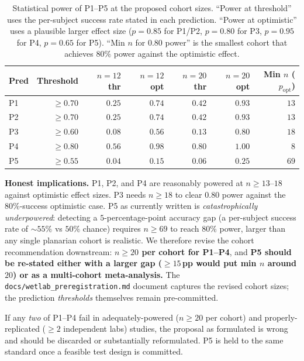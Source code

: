 \documentclass[11pt,a4paper]{article}
\begin{document}
\begin{table}[h]\centering\small
\caption{Statistical power of P1--P5 at the proposed cohort sizes. ``Power at threshold'' uses the per-subject success rate stated in each prediction. ``Power at optimistic'' uses a plausible larger effect size ($p=0.85$ for P1/P2, $p=0.80$ for P3, $p=0.95$ for P4, $p=0.65$ for P5). ``Min $n$ for $0.80$ power'' is the smallest cohort that achieves $80\%$ power against the optimistic effect.}\label{tab:power}
\begin{tabular}{lrrrrrr}\toprule
Pred & Threshold & $n=12$ thr & $n=12$ opt & $n=20$ thr & $n=20$ opt & Min $n$ ($p_{\mathrm{opt}}$) \\
\midrule
P1   & $\geq 0.70$ & $0.25$ & $0.74$ & $0.42$ & $0.93$ & $13$ \\
P2   & $\geq 0.70$ & $0.25$ & $0.74$ & $0.42$ & $0.93$ & $13$ \\
P3   & $\geq 0.60$ & $0.08$ & $0.56$ & $0.13$ & $0.80$ & $18$ \\
P4   & $\geq 0.80$ & $0.56$ & $0.98$ & $0.80$ & $1.00$ & $8$ \\
P5   & $\geq 0.55$ & $0.04$ & $0.15$ & $0.06$ & $0.25$ & $69$ \\
\bottomrule\end{tabular}
\end{table}

\textbf{Honest implications.} P1, P2, and P4 are reasonably powered at $n\geq 13$--$18$ against optimistic effect sizes. P3 needs $n\geq 18$ to clear $0.80$ power against the $80\%$-success optimistic case. P5 as currently written is \emph{catastrophically underpowered}: detecting a $5$-percentage-point accuracy gap (a per-subject success rate of $\sim$$55\%$ vs $50\%$ chance) requires $n\geq 69$ to reach $80\%$ power, larger than any single planarian cohort is realistic. We therefore revise the cohort recommendation downstream: \textbf{$n\geq 20$ per cohort for P1--P4}, and \textbf{P5 should be re-stated either with a larger gap ($\geq 15$\,pp would put min $n$ around $20$) or as a multi-cohort meta-analysis.} The \texttt{docs/wetlab\_preregistration.md} document captures the revised cohort sizes; the prediction \emph{thresholds} themselves remain pre-committed.

If any \emph{two} of P1--P4 fail in adequately-powered ($n\geq 20$ per cohort) and properly-replicated ($\geq 2$ independent labs) studies, the proposal as formulated is wrong and should be discarded or substantially reformulated. P5 is held to the same standard once a feasible test design is committed.
\end{document}
